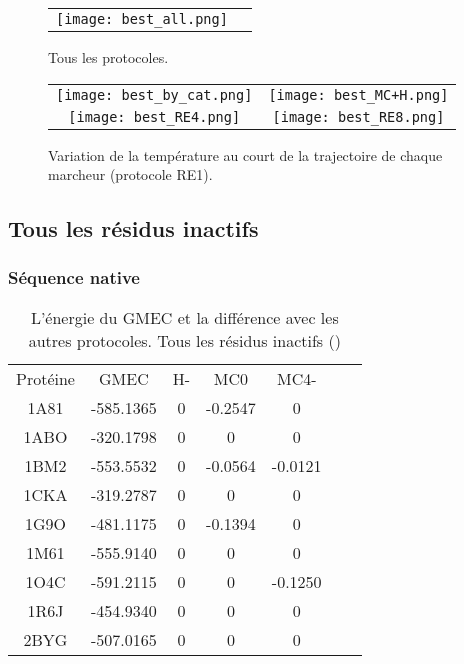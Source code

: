    \clearpage

   \begin{figure}[t]
     \centering
     \begin{tabular}{cc}
       \texttt{[image: best\_all.png]} \\
     \end{tabular}
     \caption{Tous les protocoles.}
\label{graph:best_ener_all_all}
   \end{figure}


    \clearpage


   \begin{figure}[t]
     \centering
     \begin{tabular}{cc}
       \texttt{[image: best\_by\_cat.png]} &
       \texttt{[image: best\_MC+H.png]} \\
       \texttt{[image: best\_RE4.png]} &
       \texttt{[image: best\_RE8.png]} \\
     \end{tabular}
     \caption{Variation de la température au court de la trajectoire de chaque marcheur (protocole RE1).}
\label{graph:best_ener_by_algo}
   \end{figure}


    \clearpage

   \subsection{Tous les résidus inactifs}
 
   \subsubsection{Séquence native}

 
    \begin{table}[h]
      \centering

      \begin{tabular}{ccccccc}

        \toprule
        Protéine & GMEC & H- & MC0 & MC4- \\
        \cmidrule{1-5}
        1A81 & -585.1365 & 0 & -0.2547 & 0 \\
        1ABO & -320.1798 & 0 & 0 & 0 \\
        1BM2 & -553.5532 & 0 & -0.0564 & -0.0121 \\
        1CKA & -319.2787 & 0 & 0 & 0 \\
        1G9O & -481.1175 & 0 & -0.1394 & 0 \\
        1M61 & -555.9140 & 0 & 0 & 0 \\
        1O4C & -591.2115 & 0 & 0 & -0.1250 \\
        1R6J & -454.9340 & 0 & 0 & 0 \\
        2BYG & -507.0165 & 0 & 0 & 0 \\        
        \bottomrule


      \end{tabular}      
      \caption{L’énergie du GMEC et la différence avec les autres protocoles. Tous les résidus inactifs ()}
\label{tab:result_no_active}      
    \end{table}


